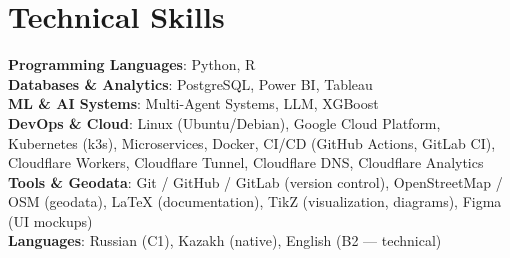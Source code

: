 \documentclass[letterpaper,11pt]{article}
\begin{document}
\section{Technical Skills}
 \begin{itemize}[leftmargin=0.15in, label={}]
    \small{\item{
     \textbf{Programming Languages}{: Python, R} \\
     \textbf{Databases \& Analytics}{: PostgreSQL, Power BI, Tableau} \\
     \textbf{ML \& AI Systems}{: Multi-Agent Systems, LLM, XGBoost} \\
     \textbf{DevOps \& Cloud}{: Linux (Ubuntu/Debian), Google Cloud Platform, Kubernetes (k3s), Microservices, Docker, CI/CD (GitHub Actions, GitLab CI), Cloudflare Workers, Cloudflare Tunnel, Cloudflare DNS, Cloudflare Analytics} \\
     \textbf{Tools \& Geodata}{: Git / GitHub / GitLab (version control), OpenStreetMap / OSM (geodata), LaTeX (documentation), TikZ (visualization, diagrams), Figma (UI mockups)} \\
     \textbf{Languages}{: Russian (C1), Kazakh (native), English (B2 — technical)}
    }}
 \end{itemize}


\end{document}
